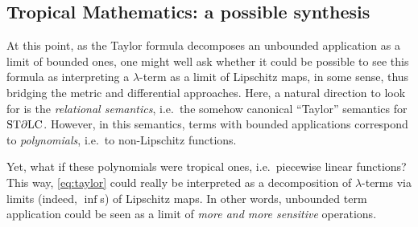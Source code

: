 %


\subsection{Tropical Mathematics: a possible synthesis}%



At this point, as the Taylor formula decomposes an unbounded application as a limit of bounded ones, one might well ask whether it could be possible to see this formula as interpreting  a $\lambda$-term 
as a limit of Lipschitz maps, in some sense, thus bridging the metric and differential approaches.  
Here, a natural direction to look for is the \emph{relational semantics}, i.e.~the somehow canonical ``Taylor'' semantics for $\mathrm{ST}\partial\mathrm{LC}$. 
However, in this semantics, terms with bounded applications correspond to \emph{polynomials}, i.e.~to non-Lipschitz functions. 

Yet, what if these polynomials were tropical ones, i.e.~piecewise linear functions? This way, \eqref{eq:taylor} could really be interpreted as a decomposition of $\lambda$-terms via limits (indeed, $\inf$s) of Lipschitz maps. In other words, unbounded term application could be seen 
as a limit of \emph{more and more sensitive} operations. 


